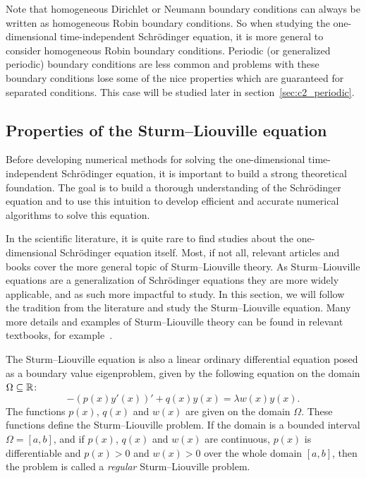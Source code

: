 Note that homogeneous Dirichlet or Neumann boundary conditions can always be written as homogeneous Robin boundary conditions. So when studying the one-dimensional time-independent Schrödinger equation, it is more general to consider homogeneous Robin boundary conditions. Periodic (or generalized periodic) boundary conditions are less common and problems with these boundary conditions lose some of the nice properties which are guaranteed for separated conditions. This case will be studied later in section~\ref{sec:c2_periodic}.

\subsection{Properties of the Sturm--Liouville equation}\label{sec:c2_slp_properties}

Before developing numerical methods for solving the one-dimensional time-independent Schrödinger equation, it is important to build a strong theoretical foundation. The goal is to build a thorough understanding of the Schrödinger equation and to use this intuition to develop efficient and accurate numerical algorithms to solve this equation.

In the scientific literature, it is quite rare to find studies about the one-dimensional Schrödinger equation itself. Most, if not all, relevant articles and books cover the more general topic of Sturm--Liouville theory. As Sturm--Liouville equations are a generalization of Schrödinger equations they are more widely applicable, and as such more impactful to study. In this section, we will follow the tradition from the literature and study the Sturm--Liouville equation. Many more details and examples of Sturm--Liouville theory can be found in relevant textbooks, for example~\cite[chapter~5]{sagan_boundary_1961}.

The Sturm--Liouville equation is also a linear ordinary differential equation posed as a boundary value eigenproblem, given by the following equation on the domain $\Omega \subseteq \mathbb{R}$:
\begin{equation}\label{equ:c2_sturm_liovuille_equation}
    -(p(x) y'(x))' + q(x) y(x) = \lambda w(x) y(x)\text{.}
\end{equation}
The functions $p(x)$, $q(x)$ and $w(x)$ are given on the domain $\Omega$. These functions define the Sturm--Liouville problem. If the domain is a bounded interval $\Omega = [a, b]$, and if $p(x)$, $q(x)$ and $w(x)$ are continuous, $p(x)$ is differentiable and $p(x) > 0$ and $w(x) > 0$ over the whole domain $[a, b]$, then the problem is called a \emph{regular} Sturm--Liouville problem.

